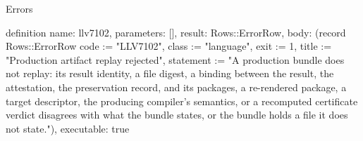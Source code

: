\begin{lexlean}{Errors}
\begin{semanticmodule}
definition{
  name: llv7102,
  parameters: [],
  result: Rows::ErrorRow,
  body: (record Rows::ErrorRow {code := "LLV7102", class := "language", exit := 1, title := "Production artifact replay rejected", statement := "A production bundle does not replay: its result identity, a file digest, a binding between the result, the attestation, the preservation record, and its packages, a re-rendered package, a target descriptor, the producing compiler's semantics, or a recomputed certificate verdict disagrees with what the bundle states, or the bundle holds a file it does not state."}),
  executable: true
}
\end{semanticmodule}
\end{lexlean}
